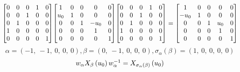 \documentclass[11pt]{article}
\theoremstyle{definition}
\begin{document}
\[
\scaletoalign{\textwidth}{{\left[\begin{matrix}0 & 0 & 0 & 1 & 0\\0 & 0 & 1 & 0 & 0\\0 & 1 & 0 & 0 & 0\\1 & 0 & 0 & 0 & 0\\0 & 0 & 0 & 0 & 1\end{matrix}\right]} {\left[\begin{matrix}1 & 0 & 0 & 0 & 0\\u_{0} & 1 & 0 & 0 & 0\\0 & 0 & 1 & - u_{0} & 0\\0 & 0 & 0 & 1 & 0\\0 & 0 & 0 & 0 & 1\end{matrix}\right]} {\left[\begin{matrix}0 & 0 & 0 & 1 & 0\\0 & 0 & 1 & 0 & 0\\0 & 1 & 0 & 0 & 0\\1 & 0 & 0 & 0 & 0\\0 & 0 & 0 & 0 & 1\end{matrix}\right]} = {\left[\begin{matrix}1 & 0 & 0 & 0 & 0\\- u_{0} & 1 & 0 & 0 & 0\\0 & 0 & 1 & u_{0} & 0\\0 & 0 & 0 & 1 & 0\\0 & 0 & 0 & 0 & 1\end{matrix}\right]}}
\]
\[
\alpha = \left( -1, \  -1, \  0, \  0, \  0\right), \beta = \left( 0, \  -1, \  0, \  0, \  0\right), \sigma_{\alpha}(\beta) = \left( 1, \  0, \  0, \  0, \  0\right)
\]
\[
\scaletoalign{\textwidth}{w_{\alpha} X_{\beta}\left(u_{0}\right) w_{\alpha}^{-1} = X_{\sigma_{\alpha}\left(\beta\right)}\left(u_{0}\right)}
\]
\end{document}
